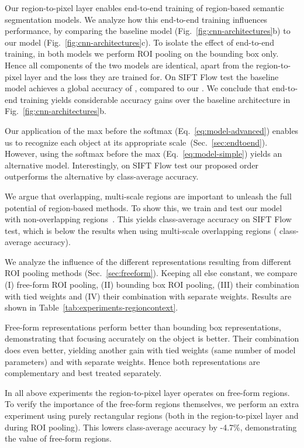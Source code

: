 Our region-to-pixel layer enables end-to-end training of region-based semantic segmentation models.
We analyze how this end-to-end training influences performance, by comparing the baseline model
(Fig.~\ref{fig:cnn-architectures}b) to our model (Fig.~\ref{fig:cnn-architectures}c). To isolate the effect of end-to-end training, in
both models we perform ROI pooling on the bounding box only.
Hence all components of the two models are identical, apart from the region-to-pixel layer and the loss they are trained for.
On SIFT Flow test the baseline model achieves a global accuracy of , compared to our . 
We conclude that end-to-end training yields considerable accuracy gains over the baseline architecture in Fig.~\ref{fig:cnn-architectures}b.

Our application of the max before the softmax (Eq.~\ref{eq:model-advanced}) enables us to recognize each object at its appropriate scale~(Sec.~\ref{sec:endtoend}).
However, using the softmax before the max (Eq.~\ref{eq:model-simple}) yields an alternative model.
Interestingly, on SIFT Flow test our proposed order outperforms the alternative by  class-average accuracy.

We argue that overlapping, multi-scale regions are important to unleash the full potential of region-based methods.
To show this, we train and test our model with non-overlapping regions~\cite{felzenszwalb04ijcv}.
This yields  class-average accuracy on SIFT Flow test,
which is below the results when using multi-scale overlapping regions ( class-average accuracy).


We analyze the influence of the different representations resulting from different ROI pooling
methods (Sec.~\ref{sec:freeform}). Keeping all else constant, we compare
(I) free-form ROI pooling, (II) bounding box ROI pooling, (III) their combination with tied weights
and (IV) their combination with separate weights. Results are shown in
Table~\ref{tab:experiments-regioncontext}.

Free-form representations perform  better than bounding box representations, demonstrating that
focusing accurately on the object is better.
Their combination does even better, yielding another  gain with tied weights (same number of model parameters) and  with separate weights. Hence both representations are complementary and best treated separately.

In all above experiments the region-to-pixel layer operates on free-form regions.
To verify the importance of the free-form regions themselves, we perform an extra experiment using purely rectangular regions (both in the region-to-pixel layer and during ROI pooling).
This lowers class-average accuracy by -4.7\%, demonstrating the value of free-form regions.
